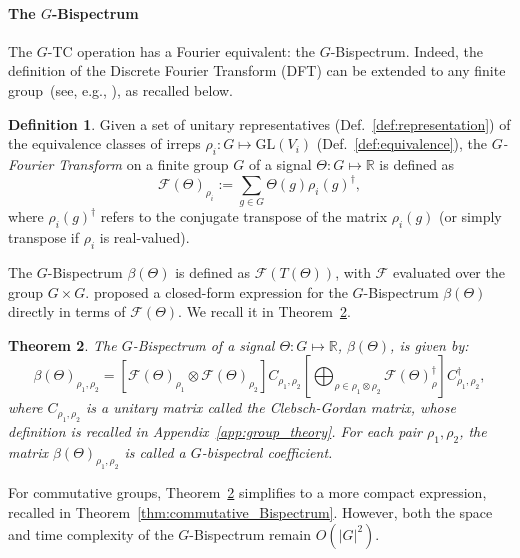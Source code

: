 \documentclass{article}
\theoremstyle{plain}
\newtheorem{theorem}{Theorem}[section]
\theoremstyle{definition}
\newtheorem{definition}[theorem]{Definition}
\theoremstyle{remark}
\begin{document}
\paragraph{The $G$-Bispectrum} The $G$-TC operation has a Fourier equivalent: the $G$-Bispectrum. Indeed, the definition of the Discrete Fourier Transform (DFT) can be extended to any finite group~(see, e.g., \citep{Diaconis1990EfficientCO}), as recalled below.
\begin{definition}
    Given a set of unitary representatives (Def.~\ref{def:representation}) of the equivalence classes of irreps $\rho_i:G\mapsto\mathrm{GL}(V_i)$ (Def.~\ref{def:equivalence}),
    the \emph{$G$-Fourier Transform} on a finite group $G$ of a signal $\Theta:G\mapsto\mathbb{R}$  is defined as
    \begin{equation}
        \mathcal{F}(\Theta)_{\rho_i} :=\sum_{g\in G}\Theta(g)\rho_i(g)^\dagger,
    \end{equation}
     where $\rho_i(g)^\dagger$ refers to the conjugate transpose of the matrix $\rho_i(g)$  (or simply transpose if $\rho_i$ is real-valued).
\end{definition}

The $G$-Bispectrum $\beta(\Theta)$ is defined as $\mathcal{F}(T(\Theta))$, with $\mathcal{F}$ evaluated over the group $G\times G$.
\citet{kakarala_thesis} proposed a closed-form expression for the $G$-Bispectrum $\beta(\Theta)$ directly in terms of $\mathcal{F}(\Theta)$. We recall it in Theorem~\ref{def:Bispectrum}.

\begin{theorem}{\citep{kakarala_finite_groups}}\label{def:Bispectrum}
    The $G$-Bispectrum  of a signal $\Theta:G\mapsto\mathbb{R}$, $\beta(\Theta)$, is given by:
    \begin{equation*}
        \beta(\Theta)_{\rho_1,\rho_2} =\left[\mathcal{F}(\Theta)_{\rho_1}\otimes\mathcal{F}(\Theta)_{\rho_2}\right]C_{\rho_1,\rho_2}\left[\bigoplus_{\rho\in\rho_1\otimes\rho_2}\mathcal{F}(\Theta)_\rho^\dagger\right]C_{\rho_1,\rho_2}^{\dagger},
    \end{equation*}
    where $C_{\rho_1,\rho_2}$ is a unitary matrix called the Clebsch-Gordan matrix, whose definition is recalled in Appendix~\ref{app:group_theory}.
    For each pair $\rho_1, \rho_2$, the matrix $\beta(\Theta)_{\rho_1, \rho_2}$ is called a $G$-bispectral coefficient.
\end{theorem}

For commutative groups, Theorem~\ref{def:Bispectrum} simplifies to a more compact expression, recalled in Theorem~\ref{thm:commutative_Bispectrum}. However, both the space and time complexity of the $G$-Bispectrum remain $O(|G|^2)$.
\end{document}
